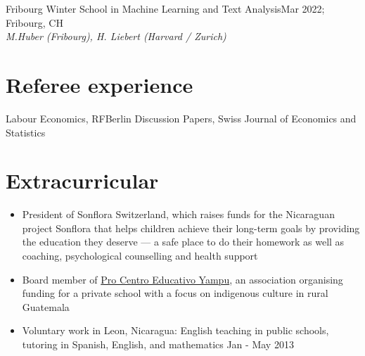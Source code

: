 \documentclass[letter, 11pt]{res}
\begin{document}
\begin{resume}
Fribourg Winter School in Machine Learning and Text Analysis\hfill Mar 2022; Fribourg, CH\\
\textit{M.Huber (Fribourg), H. Liebert (Harvard / Zurich)} \\


\vspace{0.5cm}
\section{Referee experience}
\vspace{1mm}
Labour Economics, RFBerlin Discussion Papers, Swiss Journal of Economics and Statistics\\

\vspace{0.5cm}
\section{Extracurricular}
\vspace{0.5cm}
\begin{itemize}[topsep=0pt]
\item [--] President of Sonflora Switzerland, which raises funds for the Nicaraguan project Sonflora that helps children achieve their long-term goals by providing the education they deserve --- a safe place to do their homework as well as coaching, psychological counselling and health support

\item [--]Board member of \href{https://ceyampu.org/}{Pro Centro Educativo Yampu}, an association organising funding for a private school with a focus on indigenous culture in rural Guatemala

\item [--]Voluntary work in Leon, Nicaragua: English teaching in public schools, tutoring in Spanish, English, and mathematics \hfill Jan - May 2013
\end{itemize}



\end{resume}
\end{document}
